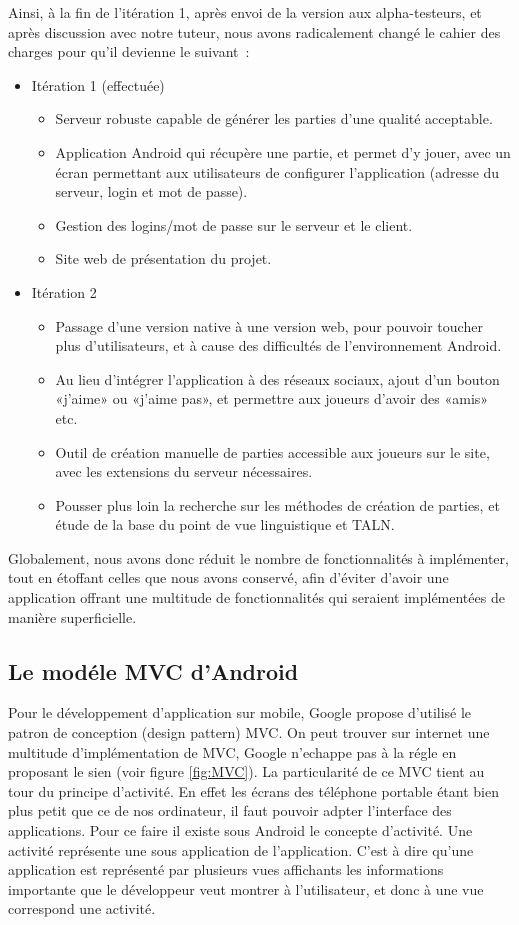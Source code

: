 \documentclass[a4paper,11pt,french]{article}
\def\android{Android\texttrademark{}}
\begin{document}
Ainsi, à la fin de l'itération 1, après envoi de la version aux alpha-testeurs, et après discussion avec notre tuteur, nous avons
radicalement changé le cahier des charges pour qu'il devienne le suivant~:
\begin{itemize}
\item Itération 1 (effectuée)
  \begin{itemize}
  \item Serveur robuste capable de générer les parties d'une qualité acceptable.
  \item Application \android{} qui récupère une partie, et permet d'y jouer, avec un écran permettant aux utilisateurs de configurer
    l'application (adresse du serveur, login et mot de passe).
  \item Gestion des logins/mot de passe sur le serveur et le client.
  \item Site web de présentation du projet.
  \end{itemize}
\item Itération 2
  \begin{itemize}
  \item Passage d'une version native à une version web, pour pouvoir toucher plus d'utilisateurs, et à cause des difficultés de l'environnement Android.
  \item Au lieu d'intégrer l'application à des réseaux sociaux, ajout d'un bouton «j'aime» ou «j'aime pas», et permettre aux joueurs d'avoir des «amis» etc.
  \item Outil de création manuelle de parties accessible aux joueurs sur le site, avec les extensions du serveur nécessaires.
  \item Pousser plus loin la recherche sur les méthodes de création de parties, et étude de la base du point de vue linguistique et TALN.
  \end{itemize}
\end{itemize}

Globalement, nous avons donc réduit le nombre de fonctionnalités à implémenter, tout en étoffant celles que nous avons conservé, afin
d'éviter d'avoir une application offrant une multitude de fonctionnalités qui seraient implémentées de manière superficielle.

\subsection{Le modéle MVC d'\android{}}
Pour le développement d'application sur mobile, Google propose d'utilisé le patron de conception (design pattern) MVC. On peut trouver sur internet une multitude d'implémentation de MVC, Google n'echappe pas à la régle en proposant
le sien (voir figure \ref{fig:MVC}).
La particularité de ce MVC tient au tour du principe d'activité. En effet les écrans des téléphone portable étant bien plus petit que ce de nos ordinateur, il faut pouvoir adpter l'interface des applications. Pour ce faire il existe
sous \android{} le concepte d'activité.
Une activité représente une sous application de l'application. C'est à dire qu'une application est représenté par plusieurs vues affichants les informations importante que le développeur veut montrer à l'utilisateur, et donc à une vue
correspond une activité.
\end{document}

